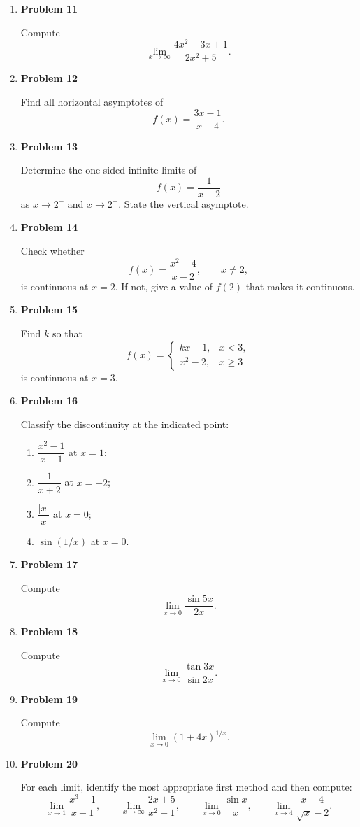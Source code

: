 \begin{enumerate}
\item \textbf{Problem 11}\par
Compute
\[
\lim_{x\to\infty}\frac{4x^2-3x+1}{2x^2+5}.
\]

\item \textbf{Problem 12}\par
Find all horizontal asymptotes of
\[
f(x)=\frac{3x-1}{x+4}.
\]

\item \textbf{Problem 13}\par
Determine the one-sided infinite limits of
\[
f(x)=\frac{1}{x-2}
\]
as \(x\to2^-\) and \(x\to2^+\). State the vertical asymptote.

\item \textbf{Problem 14}\par
Check whether
\[
f(x)=\frac{x^2-4}{x-2},\qquad x\ne2,
\]
is continuous at \(x=2\). If not, give a value of \(f(2)\) that makes it continuous.

\item \textbf{Problem 15}\par
Find \(k\) so that
\[
f(x)=
\begin{cases}
kx+1,&x<3,\\
x^2-2,&x\ge3
\end{cases}
\]
is continuous at \(x=3\).

\item \textbf{Problem 16}\par
Classify the discontinuity at the indicated point:
\begin{enumerate}
\item \(\dfrac{x^2-1}{x-1}\) at \(x=1\);
\item \(\dfrac{1}{x+2}\) at \(x=-2\);
\item \(\dfrac{|x|}{x}\) at \(x=0\);
\item \(\sin(1/x)\) at \(x=0\).
\end{enumerate}

\item \textbf{Problem 17}\par
Compute
\[
\lim_{x\to0}\frac{\sin 5x}{2x}.
\]

\item \textbf{Problem 18}\par
Compute
\[
\lim_{x\to0}\frac{\tan 3x}{\sin 2x}.
\]

\item \textbf{Problem 19}\par
Compute
\[
\lim_{x\to0}(1+4x)^{1/x}.
\]

\item \textbf{Problem 20}\par
For each limit, identify the most appropriate first method and then compute:
\[
\lim_{x\to1}\frac{x^3-1}{x-1},
\qquad
\lim_{x\to\infty}\frac{2x+5}{x^2+1},
\qquad
\lim_{x\to0}\frac{\sin x}{x},
\qquad
\lim_{x\to4}\frac{x-4}{\sqrt{x}-2}.
\]
\end{enumerate}
